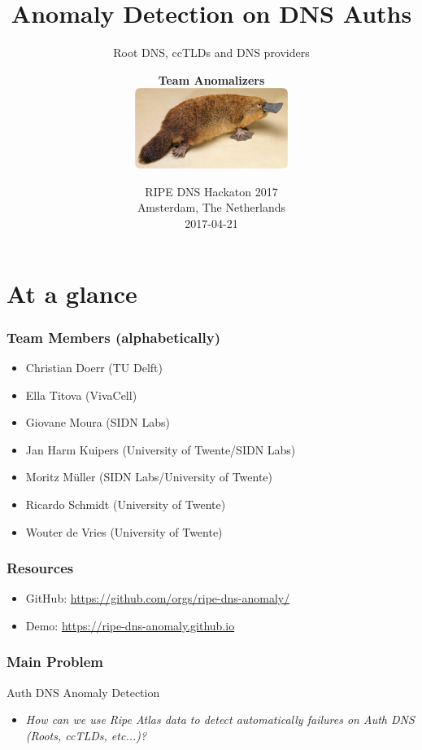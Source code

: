 \documentclass[serif]{beamer}
\title{Anomaly Detection on DNS Auths }
\subtitle{Root DNS, ccTLDs and DNS providers}
\author[\large \textbf{Team \cancel{Schnabeltier}}

]
{\large \textbf{Team \cancel{Schabeltier}Anomalizers}\\
\vspace{0.5cm}
\includegraphics[width=5cm]{fig/Schnabeltier.jpg}
}
\date[IETF98] %
{RIPE DNS Hackaton 2017\\Amsterdam, The Netherlands\\
2017-04-21}
\begin{document}
\frame{\titlepage}

\section{At a glance}

\begin{frame}
	\frametitle{Team Members (alphabetically)}
	
	\begin{itemize}
	\item Christian Doerr (TU Delft)
	\item Ella Titova (VivaCell)
	\item Giovane Moura (SIDN Labs)
	\item Jan Harm Kuipers (University of Twente/SIDN Labs)
	\item Moritz M\"uller (SIDN Labs/University of Twente)
	\item Ricardo Schmidt (University of Twente)
	\item Wouter de Vries (University of Twente)
	\end{itemize}


\end{frame}

\begin{frame}
	\frametitle{Resources}
	
	\begin{itemize}
	  \item GitHub: \url{https://github.com/orgs/ripe-dns-anomaly/}
	  \item Demo: \url{https://ripe-dns-anomaly.github.io}
	\end{itemize}


\end{frame}



\begin{frame}
	\frametitle{Main Problem}
	
	\begin{block}{Auth DNS Anomaly Detection}
	\begin{itemize}
	 \item \textit{How can we use Ripe Atlas data to detect automatically 
failures on Auth DNS (Roots, ccTLDs, etc...)?}
	\end{itemize}

	\end{block}

\end{frame}
\end{document}
